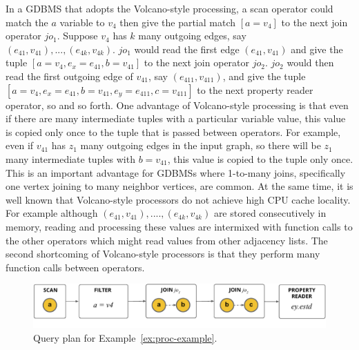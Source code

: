  In a GDBMS that adopts the Volcano-style processing, a scan operator could match the $a$ variable to $v_4$  then give the partial match $[a=v_4]$ to the next join operator $jo_1$. Suppose $v_4$ has $k$ many outgoing edges, say $(e_{41}, v_{41}), ..., (e_{4k}, v_{4k})$. $jo_1$ would read the first edge $(e_{41}, v_{41})$ and give the tuple $[a=v_4, e_x=e_{41}, b=v_{41}]$ to the next join operator $jo_2$. $jo_2$ would then read the first outgoing edge of $v_{41}$, say $(e_{411}, v_{411})$, and give the tuple  $[a=v_4, e_x=e_{41}, b=v_{41}, e_y=e_{411}, c=v_{411}]$ to the next property reader operator, so and so forth. One advantage of Volcano-style processing is that even if there are many intermediate tuples with a particular variable  value, this value is copied only once to the tuple that is passed between operators. For example, even if $v_{41}$ has $z_1$ many outgoing edges in the input graph, so there will be $z_1$ many intermediate tuples with $b=v_{41}$, this value is copied to the tuple only once. This is an important advantage for GDBMSs where 1-to-many joins, specifically one vertex joining to many neighbor vertices, are common. At the same time, it is well known that Volcano-style processors do not achieve high CPU cache locality. For example although $(e_{41}, v_{41}), ...., (e_{4k}, v_{4k})$ are stored consecutively in memory, reading and processing these values are intermixed with function calls to the other operators which might read values from other adjacency lists. The second shortcoming of Volcano-style processors is that they perform many function calls between operators.

\vspace{-5pt}

\begin{figure}
	\begin{center}
		\includegraphics[scale=0.78]{img/proc-qp}
	\end{center}
		\caption{Query plan for Example~\ref{ex:proc-example}.}
	\label{fig:proc-qp}
\end{figure}

